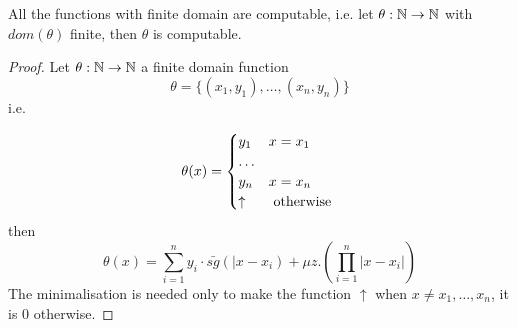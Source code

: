 \begin{lemma}
  All the functions with finite domain are computable, i.e. let
  $\theta: \mathbb{N}\rightarrow\mathbb{N}$ with $dom(\theta)$ finite, then
  $\theta$ is computable.
\end{lemma}
  
\begin{proof}
  Let $\theta:\mathbb{N}\rightarrow\mathbb{N}$ a finite domain function
  \[
    \theta=\{(x_1,y_1),\dots,(x_n,y_n)\}
  \]
  i.e.
  
  \[
    \theta(x) = \begin{cases}
      y_1      & x=x_1         \\
      \dots                    \\
      y_n      & x=x_n         \\
      \uparrow & $ otherwise $
    \end{cases}
  \]
  then
  \[
    \theta(x) = \sum_{i=1}^{n}y_i \cdot \bar{sg}(|x-x_i) + \mu z. (\prod_{i=1}^{n}|x-x_i|)
  \]
  The minimalisation is needed only to make the function $\uparrow$ when $x\not= x_1,\dots,x_n$, it is $0$ otherwise.
\end{proof}